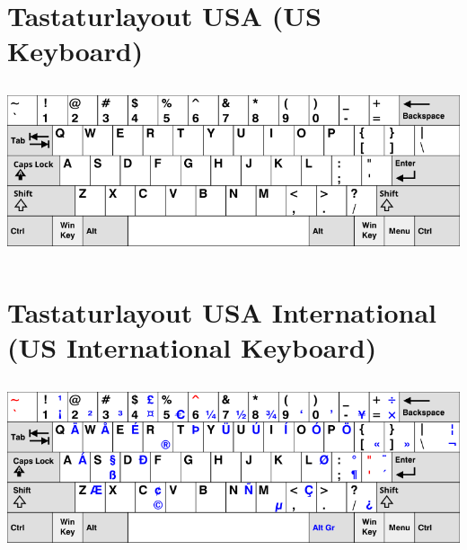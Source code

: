 \documentclass[10pt,a4paper]{article}
\begin{document}
\cheatsheet

\section{Tastaturlayout USA (US Keyboard)}
\begin{center}
  \includegraphics[height=5cm]{us.png}
\end{center}

\section{Tastaturlayout USA International (US International Keyboard)}
\begin{center}
  \includegraphics[height=5cm]{us-international.png}
\end{center}
\end{document}
